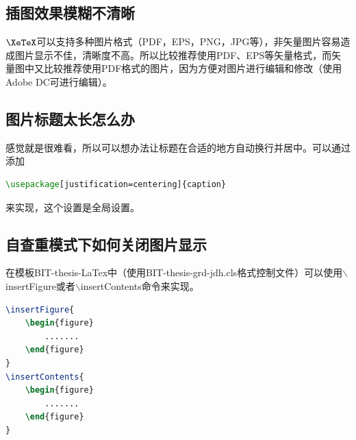 \subsection{插图效果模糊不清晰}
$\XeTeX$可以支持多种图片格式（PDF，EPS，PNG，JPG等），非矢量图片容易造成图片显示不佳，清晰度不高。所以比较推荐使用PDF、EPS等矢量格式，而矢量图中又比较推荐使用PDF格式的图片，因为方便对图片进行编辑和修改（使用Adobe DC可进行编辑）。
\subsection{图片标题太长怎么办}
感觉就是很难看，所以可以想办法让标题在合适的地方自动换行并居中。可以通过添加
\begin{lstlisting}[language={tex}, caption={}]
\usepackage[justification=centering]{caption}
\end{lstlisting}
来实现，这个设置是全局设置。

\subsection{自查重模式下如何关闭图片显示}
在模板BIT-thesis-LaTex中（使用BIT-thesis-grd-jdh.cls格式控制文件）可以使用$\backslash$insertFigure或者$\backslash$insertContents命令来实现。
\begin{lstlisting}[language={tex}, caption={}]
\insertFigure{
	\begin{figure}
		.......
	\end{figure}
}
\insertContents{
	\begin{figure}
		.......
	\end{figure}
}
\end{lstlisting}
 
 
